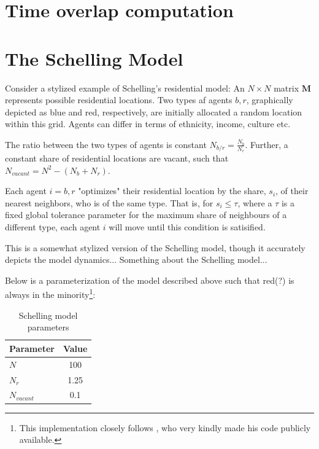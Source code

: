 \documentclass[../main.tex]{subfiles}
\begin{document}
\section{Time overlap computation}
\label{sec:time_overlap_comp_appendix}

\section{The Schelling Model}

\label{sec:appendix_schelling}

Consider a stylized example of Schelling's residential model: 
An $N \times N$ matrix $\textbf{M}$ represents possible residential locations. Two types af agents $b, r$, graphically depicted as blue and red, respectively, are initially allocated a random location within this grid. Agents can differ in terms of ethnicity, income, culture etc. 

The ratio between the two types of agents is constant $N_{b/r} = \frac{N_b}{N_r}$. Further, a constant share of residential locations are vacant, such that $N_{vacant} = N^2 - (N_b + N_r)$. 

Each agent $i = b, r$ "optimizes" their residential location by the share, $s_i$, of their nearest neighbors, who is of the same type. That is, for $s_i \leq \tau$, where a $\tau$ is a fixed global tolerance parameter for the maximum share of neighbours of a different type, each agent $i$ will move until this condition is satisified. 

This is a somewhat stylized version of the Schelling model, though it accurately depicts the model dynamics... Something about the Schelling model... 

Below is a parameterization of the model described above such that red(?) is always in the minority\footnote{This implementation closely follows \textcite{luca_mingarelli}, who very kindly made his code publicly available.}:

\begin{table}[H]
    \centering
    \caption{Schelling model parameters}
    \begin{tabular}{lc}
    \toprule
      Parameter & Value \\
    \midrule
      $N$         & 100 \\
      $N_r$       & 1.25 \\
      $N_{vacant}$ & 0.1 \\
    \bottomrule
    \end{tabular}
\end{table}
\end{document}
